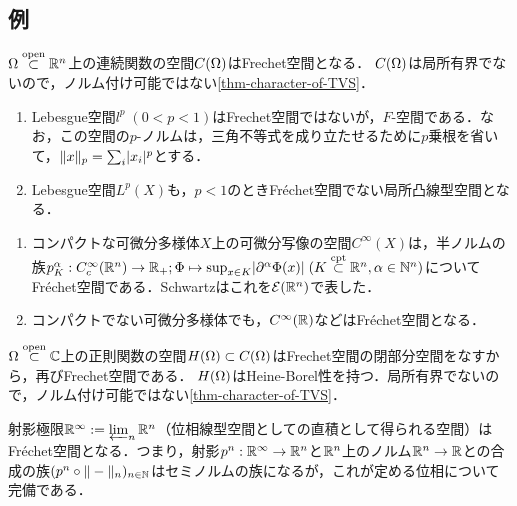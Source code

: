 \documentclass[uplatex,dvipdfmx]{jsreport}
\begin{document}
\subsection{例}

\begin{example}[連続関数の空間]
    $\Omega\overset{\mathrm{open}}{\subset}\mathbb{R}^n$上の連続関数の空間$C(\Omega)$はFrechet空間となる．
    $C(\Omega)$は局所有界でないので，ノルム付け可能ではない\ref{thm-character-of-TVS}．
\end{example}

\begin{example}[$p<1$の場合のLebesgue空間]\mbox{}
    \begin{enumerate}
        \item Lebesgue空間$l^p\;(0<p<1)$はFrechet空間ではないが，$F$-空間である．なお，この空間の$p$-ノルムは，三角不等式を成り立たせるために$p$乗根を省いて，$\|x\|_p=\sum_{i}\lvert x_i\rvert^p$とする．
        \item Lebesgue空間$L^p(X)$も，$p<1$のときFréchet空間でない局所凸線型空間となる．
    \end{enumerate}
\end{example}

\begin{example}[滑らかな関数の空間]\mbox{}
    \begin{enumerate}
        \item コンパクトな可微分多様体$X$上の可微分写像の空間$C^\infty(X)$は，半ノルムの族$p^\alpha_K:C_c^\infty(\mathbb{R}^n)\to\mathbb{R}_+;\Phi\mapsto\sup_{x\in K}\lvert\partial^\alpha\Phi(x)\rvert\;(K\overset{\textrm{cpt}}{\subset}\mathbb{R}^n,\alpha\in\mathbb{N}^n)$についてFréchet空間である．Schwartzはこれを$\mathcal{E}(\mathbb{R}^n)$で表した．
        \item コンパクトでない可微分多様体でも，$C^\infty(\mathbb{R})$などはFréchet空間となる．
    \end{enumerate}
\end{example}

\begin{example}
    $\Omega\overset{\mathrm{open}}{\subset}\mathbb{C}$上の正則関数の空間$H(\Omega)\subset C(\Omega)$はFrechet空間の閉部分空間をなすから，再びFrechet空間である．
    $H(\Omega)$はHeine-Borel性を持つ．局所有界でないので，ノルム付け可能ではない\ref{thm-character-of-TVS}．
\end{example}

\begin{example}[Euclid空間の延長線上としてのFrechet空間]
    射影極限$\mathbb{R}^\infty:=\varprojlim_n\mathbb{R}^n$（位相線型空間としての直積として得られる空間）はFréchet空間となる．つまり，射影$p^n:\mathbb{R}^\infty\to\mathbb{R}^n$と$\mathbb{R}^n$上のノルム$\mathbb{R}^n\to\mathbb{R}$との合成の族$(p^n\circ\|-\|_n)_{n\in\mathbb{N}}$はセミノルムの族になるが，これが定める位相について完備である．
\end{example}
\end{document}
